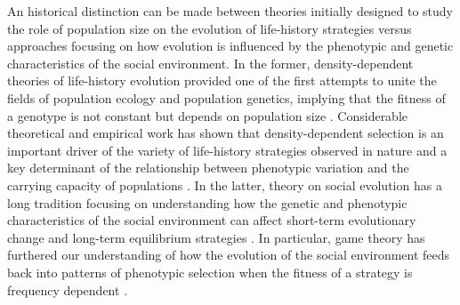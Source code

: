 \documentclass{article}
\begin{document}
	An historical distinction can be made between theories initially designed to study the role of population size on the evolution of life-history strategies versus approaches focusing on how evolution is influenced by the phenotypic and genetic characteristics of the social environment. In the former, density-dependent theories of life-history evolution provided one of the first attempts to unite the fields of population ecology and population genetics, implying that the fitness of a genotype is not constant but depends on population size \citep{MacArthur1962, Anderson1971, Charlesworth1971}. Considerable theoretical and empirical work has shown that density-dependent selection is an important driver of the variety of life-history strategies observed in nature and a key determinant of the relationship between phenotypic variation and the carrying capacity of populations \citep{macarthur1967theory,  Boyce1984, Mueller1991, Charlesworth1994,Travis2013, Joshi2001, Engen2013, Wright2018, Engen2020}. In the latter, theory on social evolution has a long tradition focusing on understanding how the genetic and phenotypic characteristics of the social environment can affect short-term evolutionary change \citep{Hamilton1964a, frank1998foundations, Wolf1999SocialSelection, Queller1985a, Queller2017} and long-term equilibrium strategies \citep{MaynardSmith1982, McGill2007}. In particular, game theory has furthered our understanding of how the evolution of the social environment feeds back into patterns of phenotypic selection when the fitness of a strategy is frequency dependent \citep{West-Eberhard1979, QUELLER1984, Araya-Ajoy2020}. 
	
\end{document}
